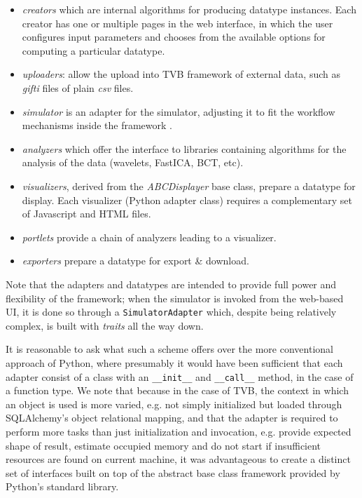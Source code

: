 \documentclass{bioinfo}
\begin{document}
\begin{itemize}
	\item \textit{creators} which are internal algorithms for producing datatype instances. 
		Each creator has one or multiple pages in the web interface, in which the user
		 configures input parameters and chooses from the available options for computing a particular datatype.

	\item \textit{uploaders}: allow the upload into TVB framework of external data, 
    		such as \emph{gifti} files of plain \emph{csv} files.

	\item \textit{simulator} is an adapter for the simulator, adjusting it to fit
		the workflow mechanisms inside the framework .

	\item \textit{analyzers} which offer the interface to libraries containing algorithms 
		for the analysis of the data (wavelets, FastICA, BCT, etc).

	\item \textit{visualizers}, derived from the \emph{ABCDisplayer} base class, prepare a datatype
		for display. Each visualizer (Python adapter class) requires a complementary set
		of Javascript and HTML files. 

	\item \textit{portlets} provide a chain of analyzers leading to a visualizer.

	\item \textit{exporters} prepare a datatype for export \& download.

\end{itemize}

Note that the adapters and datatypes are intended to provide full 
power and flexibility of the framework; when the simulator is invoked from
the web-based UI, it is done so through a \texttt{SimulatorAdapter} which,
despite being relatively complex, is built with \emph{traits} all the way down.

It is reasonable to ask what such a scheme offers over the more 
conventional approach of Python, where presumably it would have been
sufficient that each adapter consist of a class with an \texttt{\_\_init\_\_}
and \texttt{\_\_call\_\_} method, in the case of a function type. 
We note that because in the case of TVB, the context in which an object
is used is more varied, e.g. not simply initialized but loaded through 
SQLAlchemy's object relational mapping, and that the adapter is required to perform more tasks
than just initialization and invocation, e.g. provide expected shape of 
result, estimate occupied memory and do not start if insufficient resources are found on current machine,
 it was advantageous to create a distinct set of interfaces built on top of
the abstract base class framework provided by Python's standard library.
\end{document}
